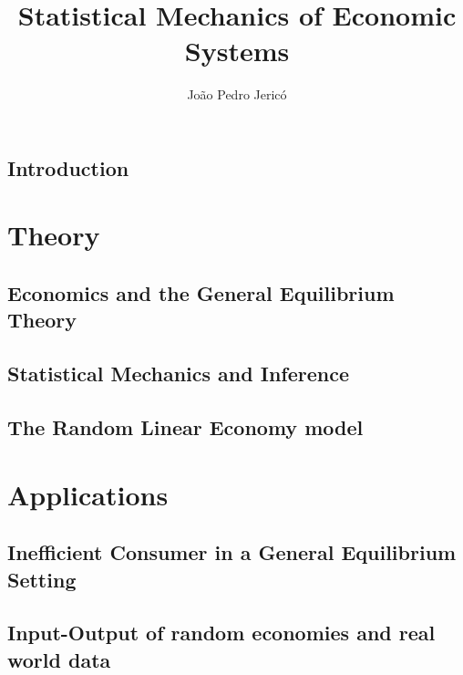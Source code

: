 \documentclass[
  oneside,
  11pt, a4paper,
  footinclude=true,
  headinclude=true,
  cleardoublepage=empty
]{scrbook}
\title{Statistical Mechanics of Economic Systems}
\author{João Pedro Jericó}
\begin{document}
\maketitle







\chapter{Introduction}




\part{Theory}

\chapter{Economics and the General Equilibrium Theory}



\chapter{Statistical Mechanics and Inference}
\label{cha:stat_mech}


\chapter{The Random Linear Economy model}
\label{cha:RLE}



\part{Applications}

\chapter{Inefficient Consumer in a General Equilibrium Setting}
\label{cha:inefficient}

\chapter{Input-Output of random economies and real world data}
\label{cha:IO}
\end{document}
